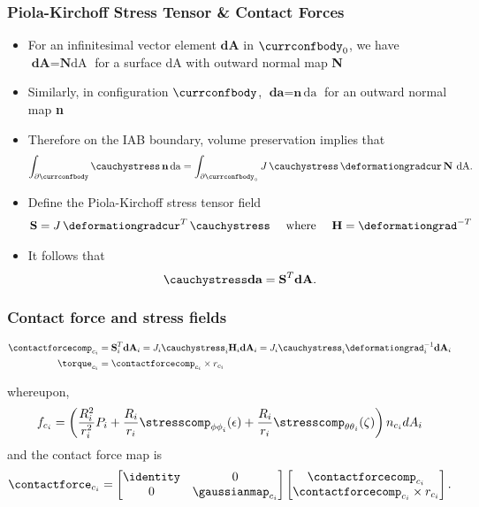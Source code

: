 \begin{frame}
	\frametitle{ Piola-Kirchoff Stress Tensor \& Contact Forces}
	\begin{itemize}
		\item For an infinitesimal vector element $\textbf{dA}$ in $\currconfbody_0$,
		we have $\textbf{dA} = \textbf{N} \text{dA}$ for a surface dA with outward normal map \textbf{N}
		\item Similarly, in configuration $\currconfbody$,  $\textbf{da} = \textbf{n}\, \text{da}$ for an outward normal map \textbf{n}
		\item Therefore on the IAB boundary, volume preservation implies that
		\begin{align}
		\int_{\partial \currconfbody} \cauchystress \, \textbf{n} \, \text{da} = \int_{\partial \currconfbody_\circ} J \, \cauchystress \, \deformationgradcur  \, \textbf{N } \text{dA}.
		\end{align}
		\item Define the Piola-Kirchoff stress tensor field 
		\begin{align}
		\textbf{S} = J \, \deformationgradcur^T \, \cauchystress
		\quad \text{ where } \quad \textbf{H} = \deformationgrad^{-T}
		\label{eq:piola-kirchoff}
		\end{align} 
		\item It follows that 
		\[
		\cauchystress \textbf{da} = \textbf{S}^T \textbf{dA}.
		\]
	\end{itemize}
\end{frame}

\begin{frame}
\frametitle{Contact force and stress fields}
\begin{tcolorbox}[title=Contact Wrench]
\begin{align}
\contactforcecomp_{c_i} &= \textbf{S}_i^T \textbf{dA}_i = J_i \cauchystress_i \textbf{H}_i \textbf{dA}_i  = J_i  \cauchystress_i \deformationgrad^{-1}_i \textbf{dA}_i \\
%
\torque_{c_i} &= \contactforcecomp_{c_i} \times r_{c_i}
\label{eq:contact_def_force} 
\end{align}
\end{tcolorbox}
whereupon,
%
\begin{align}
f_{c_i} = \left(\frac{R_i^2}{r_i^2} P_i  + \frac{R_i}{r_i} \stresscomp_{{\phi \phi}_i}(\epsilon) + \frac{R_i}{r_i} \stresscomp_{{\theta \theta}_i}(\zeta)\right) n_{c_i} {dA}_i
\label{eq:contact-force-stress-isochoric}
\end{align}
%
and the contact force map is
%
\begin{align}
\contactforce_{c_i} = \begin{bmatrix}
\identity & {0}\\
{0} & \gaussianmap_{c_i}
\end{bmatrix}
%
\begin{bmatrix}
\contactforcecomp_{c_i} \\ \contactforcecomp_{c_i} \times r_{c_i}
\end{bmatrix}.
\label{eq:contact-force-stress}
\end{align}
\end{frame}

